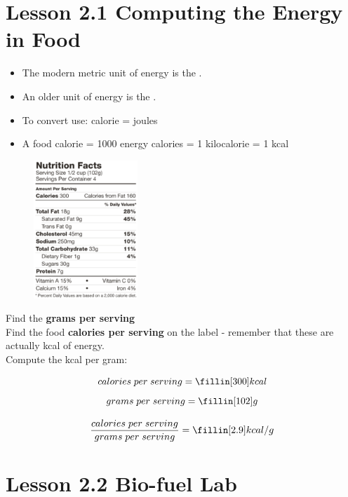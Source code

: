 \documentclass[answers,12pt]{exam}
\begin{document}
\section*{Lesson 2.1 Computing the Energy in Food}

\begin{itemize}
    \item The modern metric unit of energy is the \fillin[joule]. 
    \item An older unit of energy is the \fillin[calorie].
    \item To convert use: \fillin[1] calorie = \fillin[4.2] joules
    \item A food calorie = 1000 energy calories = 1 kilocalorie = 1 kcal
\end{itemize}
    

\begin{figure} %
    \centering
    \includegraphics[width=0.35\textwidth]{food_label.png}
\end{figure}


Find the \textbf{grams per serving} \\ 

Find the food \textbf{calories per serving} on the label - remember that these are actually kcal of energy. \\

Compute the kcal per gram:

$$ calories \; per \; serving = \fillin[300] kcal $$
$$ grams \; per \; serving = \fillin[102] g $$

$$ \frac{calories \; per \; serving}{grams \; per \; serving} = \fillin[2.9] kcal/g  $$

\vspace{1cm}

\newpage

\section*{Lesson 2.2 Bio-fuel Lab}
\end{document}
